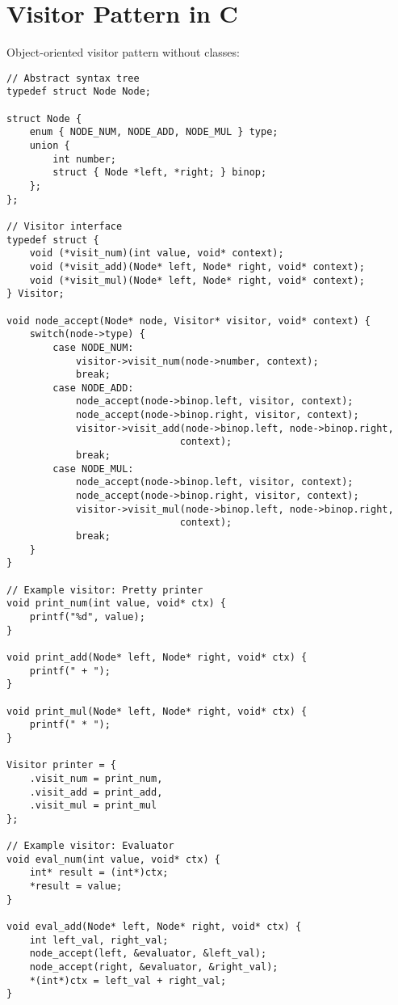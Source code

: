 \section{Visitor Pattern in C}

Object-oriented visitor pattern without classes:

\begin{lstlisting}
// Abstract syntax tree
typedef struct Node Node;

struct Node {
    enum { NODE_NUM, NODE_ADD, NODE_MUL } type;
    union {
        int number;
        struct { Node *left, *right; } binop;
    };
};

// Visitor interface
typedef struct {
    void (*visit_num)(int value, void* context);
    void (*visit_add)(Node* left, Node* right, void* context);
    void (*visit_mul)(Node* left, Node* right, void* context);
} Visitor;

void node_accept(Node* node, Visitor* visitor, void* context) {
    switch(node->type) {
        case NODE_NUM:
            visitor->visit_num(node->number, context);
            break;
        case NODE_ADD:
            node_accept(node->binop.left, visitor, context);
            node_accept(node->binop.right, visitor, context);
            visitor->visit_add(node->binop.left, node->binop.right,
                              context);
            break;
        case NODE_MUL:
            node_accept(node->binop.left, visitor, context);
            node_accept(node->binop.right, visitor, context);
            visitor->visit_mul(node->binop.left, node->binop.right,
                              context);
            break;
    }
}

// Example visitor: Pretty printer
void print_num(int value, void* ctx) {
    printf("%d", value);
}

void print_add(Node* left, Node* right, void* ctx) {
    printf(" + ");
}

void print_mul(Node* left, Node* right, void* ctx) {
    printf(" * ");
}

Visitor printer = {
    .visit_num = print_num,
    .visit_add = print_add,
    .visit_mul = print_mul
};

// Example visitor: Evaluator
void eval_num(int value, void* ctx) {
    int* result = (int*)ctx;
    *result = value;
}

void eval_add(Node* left, Node* right, void* ctx) {
    int left_val, right_val;
    node_accept(left, &evaluator, &left_val);
    node_accept(right, &evaluator, &right_val);
    *(int*)ctx = left_val + right_val;
}
\end{lstlisting}

